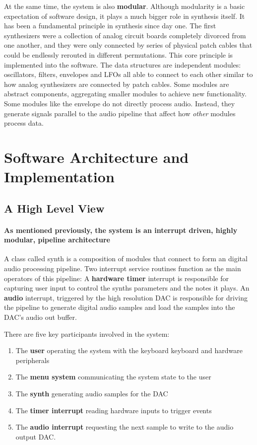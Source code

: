 \documentclass[acmlarge,screen]{acmart}
\begin{document}
	At the same time, the system is also \textbf{modular}. Although modularity is a basic expectation of software design, it plays a much bigger role in synthesis itself. It has been a fundamental principle in synthesis since day one. The first synthesizers were a collection of analog circuit boards completely divorced from one another, and they were only connected by series of physical patch cables that could be endlessly rerouted in different permutations. This core principle is implemented into the software. The data structures are independent modules: oscillators, filters, envelopes and LFOs all able to connect to each other similar to how analog synthesizers are connected by patch cables. Some modules are abstract components, aggregating smaller modules to achieve new functionality. Some modules like the envelope do not directly process audio. Instead, they generate signals parallel to the audio pipeline that affect how \textit{other} modules process data.

\section{Software Architecture and Implementation}

\subsection{A High Level View}
	\paragraph{As mentioned previously, the system is an interrupt driven, highly modular, pipeline architecture} A class called synth is a composition of modules that connect to form an digital audio processing pipeline. Two interrupt service routines function as the main operators of this pipeline: A \textbf{hardware timer} interrupt is responsible for capturing user input to control the synths parameters and the notes it plays. An \textbf{audio} interrupt, triggered by the high resolution DAC is responsible for driving the pipeline to generate digital audio samples and load the samples into the DAC's audio out buffer.
	
	There are five key participants involved in the system:
	\begin{enumerate}
		\item The \textbf{user} operating the system with the keyboard keyboard and hardware peripherals
		\item The \textbf{menu system} communicating the system state to the user
		\item The \textbf{synth} generating audio samples for the DAC
		\item The \textbf{timer interrupt} reading hardware inputs to trigger events
		\item The \textbf{audio interrupt} requesting the next sample to write to the audio output DAC.
	\end{enumerate}
\end{document}
